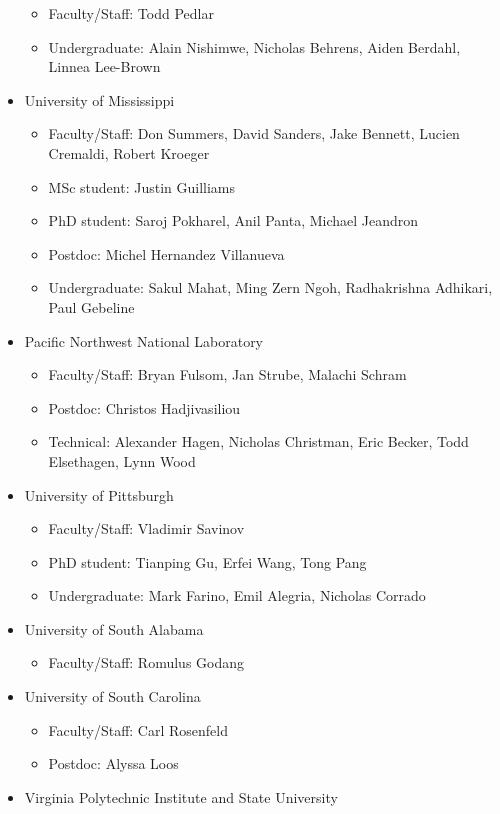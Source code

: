 \begin{itemize}
\begin{itemize}
\item Faculty/Staff:  Todd Pedlar
\item Undergraduate:  Alain Nishimwe, Nicholas Behrens, Aiden Berdahl, Linnea Lee-Brown
\end{itemize}
\item University of Mississippi
\begin{itemize}

\item Faculty/Staff:  Don Summers, David  Sanders, Jake Bennett, Lucien Cremaldi, Robert Kroeger
\item MSc student:  Justin Guilliams
\item PhD student:  Saroj Pokharel, Anil Panta, Michael Jeandron
\item Postdoc:  Michel   Hernandez Villanueva 
\item Undergraduate:  Sakul Mahat, Ming Zern Ngoh, Radhakrishna Adhikari, Paul Gebeline
\end{itemize}
\item Pacific Northwest National Laboratory
\begin{itemize}

\item Faculty/Staff:  Bryan Fulsom, Jan  Strube, Malachi Schram
\item Postdoc:  Christos Hadjivasiliou
\item Technical:  Alexander Hagen, Nicholas Christman, Eric Becker, Todd Elsethagen, Lynn Wood
\end{itemize}
\item University of Pittsburgh
\begin{itemize}

\item Faculty/Staff:  Vladimir Savinov
\item PhD student:  Tianping Gu, Erfei Wang, Tong Pang
\item Undergraduate:  Mark Farino, Emil Alegria, Nicholas Corrado
\end{itemize}
\item University of South Alabama
\begin{itemize}

\item Faculty/Staff:  Romulus Godang
\end{itemize}
\item University of South Carolina
\begin{itemize}

\item Faculty/Staff:  Carl Rosenfeld
\item Postdoc:  Alyssa Loos
\end{itemize}
\item Virginia Polytechnic Institute and State University
\begin{itemize}


\end{itemize}
\end{itemize}
